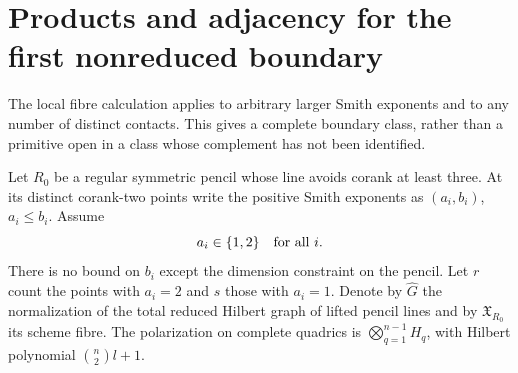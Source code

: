\documentclass[11pt,reqno]{amsart}
\numberwithin{equation}{section}
\theoremstyle{definition}\newtheorem{definition}[theorem]{Definition}
\theoremstyle{remark}\newtheorem{remark}[theorem]{Remark}
\begin{document}
\section{Products and adjacency for the first nonreduced boundary}
\label{sec:products-v163}
The local fibre calculation applies to arbitrary larger Smith exponents
and to any number of distinct contacts. This gives a complete boundary
class, rather than a primitive open in a class whose complement has
not been identified.

Let $R_0$ be a regular symmetric pencil whose line avoids corank at
least three. At its distinct corank-two points write the positive
Smith exponents as $(a_i,b_i)$, $a_i\leq b_i$. Assume
\begin{equation}\label{eq:first-boundary-class-v163}
                      a_i\in\{1,2\}\quad\hbox{for all }i.
\end{equation}
There is no bound on $b_i$ except the dimension constraint on the
pencil. Let $r$ count the points with $a_i=2$ and $s$ those with
$a_i=1$. Denote by $\widehat G$ the normalization of the total reduced
Hilbert graph of lifted pencil lines and by $\mathfrak X_{R_0}$ its
scheme fibre. The polarization on complete quadrics is
$\bigotimes_{q=1}^{n-1}H_q$, with Hilbert polynomial $\binom n2l+1$.
\end{document}

